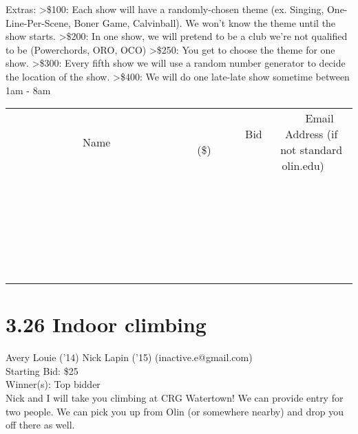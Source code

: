 \documentclass[11pt]{article}
\begin{document}
Extras:
\textgreater \$100: Each show will have a randomly-chosen theme (ex. Singing, One-Line-Per-Scene, Boner Game, Calvinball).  We won't know the theme until the show starts.
\textgreater \$200: In one show, we will pretend to be a club we're not qualified to be (Powerchords, ORO, OCO)
\textgreater \$250: You get to choose the theme for one show.
\textgreater \$300: Every fifth show we will use a random number generator to decide the location of the show.
\textgreater \$400: We will do one late-late show sometime between 1am - 8am \\[6ex]
\begin{tabular}{c c c}
~~~~~~~~~~~~~Name~~~~~~~~~~~~~ & ~~~~~~~~~Bid (\$)~~~~~~~~~ & ~~~Email Address (if not standard olin.edu)~~~ \\
 & & \\
\hline
 & & \\
\hline
 & & \\
\hline
 & & \\
\hline
 & & \\
\hline
 & & \\
\hline
 & & \\
\hline
 & & \\
\hline
 & & \\
\hline
 & & \\
\hline
 & & \\
\hline
 & & \\
\hline
 & & \\
\hline
 & & \\
\hline
 & & \\
\hline
 & & \\
\hline
 & & \\
\hline
 & & \\
\hline
 & & \\
\hline
 & & \\
\hline
 & & \\
\hline
 & & \\
\hline
 & & \\
\hline
 & & \\
\hline
 & & \\
\hline
 & & \\
\hline
\end{tabular}
\clearpage
\section*{3.26 Indoor climbing}
Avery Louie ('14) Nick Lapin ('15) (inactive.e@gmail.com) \\
Starting Bid: \$25 \\
Winner(s): 
Top bidder \\
Nick and I will take you climbing at CRG Watertown!  We can provide entry for two people.  We can pick you up from Olin (or somewhere nearby) and drop you off there as well.
\end{document}
